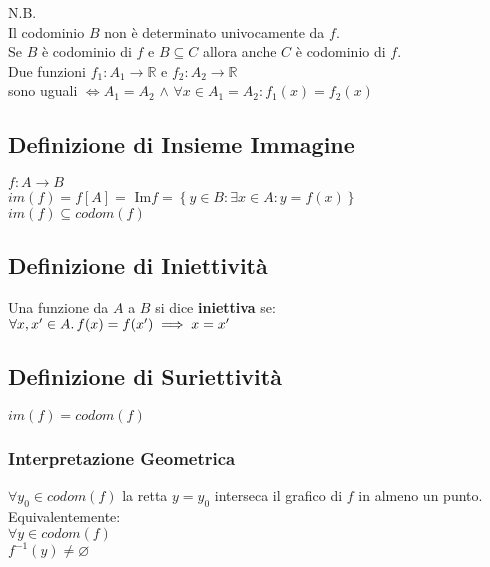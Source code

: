 \documentclass[a4paper, twoside, italian, 11pt]{book}
\newcommand{\braces}[1] {\left\{#1\right\}}
\newcommand{\R}{\mathbb{R}}
\let\emptyset\varnothing
\begin{document}
\noindent
N.B. \\
Il codominio $B$ non è determinato univocamente da $f$. \\
Se $B$ è codominio di $f$ e $B \subseteq C$ allora anche $C$ è codominio di $f$. \\

\noindent
Due funzioni $f_1 : A_1 \rightarrow \R$ e $f_2 : A_2 \rightarrow \R$ \\
sono uguali $\iff A_1 = A_2$ $\land$ $\forall x \in A_1 = A_2 : f_1(x) = f_2(x)$


\subsection{Definizione di Insieme Immagine}

\noindent
$f : A \rightarrow B$ \\
$im(f) = f[A] =$ Im$f= \braces{y \in B : \exists x \in A : y = f(x)}$ \\

\noindent
$im(f) \subseteq codom(f)$


\subsection{Definizione di Iniettività}

\noindent
Una funzione da $A$ a $B$ si dice \textbf{iniettiva} se: \\

$\forall x, x' \in A \ldotp f(x) = f(x') \implies x = x'$


\subsection{Definizione di Suriettività}

\noindent
$im(f) = codom(f)$


\subsubsection{Interpretazione Geometrica}

\noindent
$\forall y_0 \in codom(f)$ la retta $y = y_0$ interseca il grafico di $f$ in almeno un punto. \\

\noindent
Equivalentemente: \\
\indent
$\forall y \in codom(f)$ \\
\indent
$f^{-1}({y}) \neq \emptyset$ \\
\end{document}
